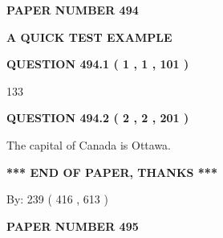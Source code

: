 \documentclass[12pt]{article}
\begin{document}
   
   
   
\newpage 
\setcounter{page}{ 
   494001 } 
   
   
   
   
 {\textbf{ \Large{ PAPER NUMBER  494  }}}
   
   
\vspace{0.2in}
   
   
   
   
   
   
 \vspace{0.2in}
{\LARGE {\textbf{ A QUICK TEST EXAMPLE}}}
   
   
  
\vspace{0.2in}
  
{\textbf{\Large{QUESTION
494.1 
 ( 1 , 1 , 101 )
}}}
  
  
 
 
\noindent{}

133
 
 
  
\vspace{0.2in}
  
{\textbf{\Large{QUESTION
494.2 
 ( 2 , 2 , 201 )
}}}
  
  
 
 
\noindent{}
 
 
The capital of Canada is Ottawa.
 
 
 
 
   
   
 \vspace{0.2in}
 
   
   
   
   
\vspace{1.0in} 
{\textbf{\large{ *** END OF PAPER, THANKS *** }}} 
   
   
\hspace{1.0in} By: 
 239 ( 416 ,  613 )
   
   
   
   
\newpage 
\setcounter{page}{ 
   495001 } 
   
   
   
   
 {\textbf{ \Large{ PAPER NUMBER  495  }}}
   
\end{document}
